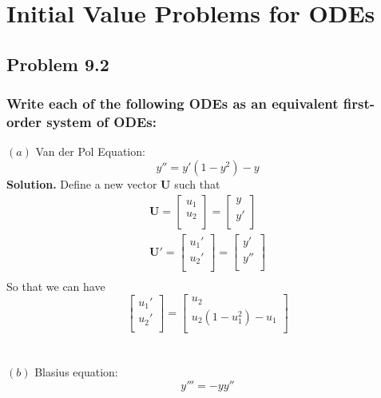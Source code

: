 \section{Initial Value Problems for ODEs}
\subsection{Problem 9.2}
\subsubsection*{Write each of the following ODEs as an equivalent first-order system of ODEs:}
$(a)$ Van der Pol Equation:
\begin{equation*}
y'' = y'\left(1-y^2\right)-y
\end{equation*}
\textbf{Solution.} Define a new vector $\mathbf{U}$ such that
\begin{align*}
\mathbf{U} = 
\begin{bmatrix}
u_1\\
u_2\\
\end{bmatrix}
=
\begin{bmatrix}
y\\
y'\\
\end{bmatrix}\\
\mathbf{U'} =
\begin{bmatrix}
u_1'\\
u_2'\\
\end{bmatrix} =
\begin{bmatrix}
y'\\
y''\\
\end{bmatrix}\\
\end{align*}
So that we can have
\begin{equation*}\boxed{
\begin{bmatrix}
u_1'\\
u_2'\\
\end{bmatrix} =
\begin{bmatrix}
u_2\\
u_2\left(1-u_1^2\right)-u_1\\
\end{bmatrix}}
\end{equation*}
\\
\\
$(b)$ Blasius equation:
\begin{equation*}
y''' = -yy''
\end{equation*}
